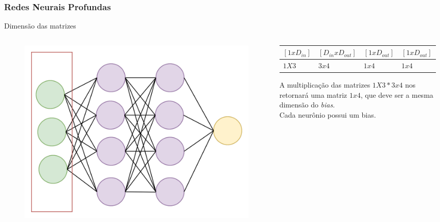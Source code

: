 \documentclass{beamer}
\begin{document}
\begin{frame}
	\frametitle{Redes Neurais Profundas}
	\begin{block}{Dimensão das matrizes}
		\begin{columns}
			\begin{column}{0.4\textwidth}
				\begin{figure}
					\centering
					\includegraphics[width=1\linewidth]{figures/simple_nn1}
				\end{figure}
			\end{column}
			\begin{column}{0.6\textwidth}
				\begin{table}[]
					\begin{tabular}{|l|l|l|l|}
						\hline
						$[1 x D_{in}]$ & $[D_{in} x D_{out}]$ &  $[1x D_{out}]$ & $ [1x D_{out}]$ \\ \hline
						$1X3$ & $3x4$ &  $1x4$ & $1x4$  \\ \hline
					\end{tabular}
				\end{table}
			A multiplicação das matrizes $1X3 * 3x4$ nos retornará uma matriz $1x4$, que deve ser a mesma dimensão do \textit{bias}. \\
			Cada neurônio possui um bias.
			\end{column}
		\end{columns}

	\end{block}
\end{frame}
\end{document}

